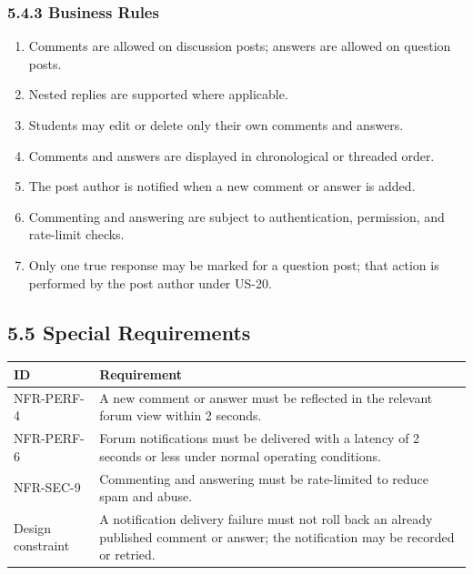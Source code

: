 \documentclass[12pt]{article}
\renewcommand{\baselinestretch}{1.5}
\begin{document}
\subsubsection*{5.4.3 Business Rules}
\par\medskip
\begin{enumerate}
\item Comments are allowed on discussion posts; answers are allowed on question posts.
\item Nested replies are supported where applicable.
\item Students may edit or delete only their own comments and answers.
\item Comments and answers are displayed in chronological or threaded order.
\item The post author is notified when a new comment or answer is added.
\item Commenting and answering are subject to authentication, permission, and rate-limit checks.
\item Only one true response may be marked for a question post; that action is performed by the post author under US-20.
\end{enumerate}
\par\medskip
\hypertarget{sec:5-5-special-requirements}{}
\subsection*{5.5 Special Requirements}
\par\medskip
\begingroup
\small
\renewcommand{\baselinestretch}{1.0}\selectfont
\renewcommand{\arraystretch}{1.15}
\setlength{\tabcolsep}{6pt}
\begin{longtable}{|>{\raggedright\arraybackslash}p{}|>{\raggedright\arraybackslash}p{}|}
\hline
\textbf{ID} & \textbf{Requirement} \\ \hline
\endhead
NFR-PERF-4 & A new comment or answer must be reflected in the relevant forum view within 2 seconds. \\ \hline
NFR-PERF-6 & Forum notifications must be delivered with a latency of 2 seconds or less under normal operating conditions. \\ \hline
NFR-SEC-9 & Commenting and answering must be rate-limited to reduce spam and abuse. \\ \hline
Design constraint & A notification delivery failure must not roll back an already published comment or answer; the notification may be recorded or retried. \\ \hline
\end{longtable}
\endgroup
\par\medskip
\hypertarget{sec:5-6-preconditions}{}
\end{document}
